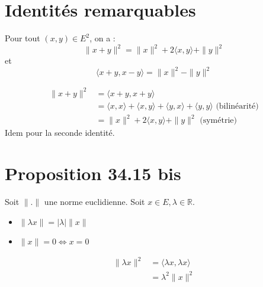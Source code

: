 \documentclass[../main.tex]{subfiles}
\begin{document}
\section{Identités remarquables}
\begin{tcolorbox}[title=Propostion 34.14, title filled=false, colframe=lightblue, colback=lightblue!10!white]
    Pour tout $(x, y) \in E^2$, on a :
    $$\|x+y\|^2=\|x\|^2+2\langle x, y\rangle+\|y\|^2$$
    et
    $$\langle x+y, x-y\rangle=\|x\|^2-\|y\|^2$$
\end{tcolorbox}

\begin{align*}
    \|x+y\|^2 &= \langle x+y, x+y\rangle \\
    &= \langle x, x\rangle + \langle x, y\rangle + \langle y, x\rangle + \langle y, y\rangle \text{ (bilinéarité)} \\
    &= \|x\|^2 + 2\langle x, y\rangle + \|y\|^2 \text{ (symétrie)}
\end{align*}
Idem pour la seconde identité. 

\section{Proposition 34.15 bis}
\begin{tcolorbox}[title=Propostion 34.15 bis, title filled=false, colframe=lightblue, colback=lightblue!10!white]
    Soit $\|.\|$ une norme euclidienne. Soit $x\in E, \lambda\in \mathbb{R}$. 
    \begin{itemize}
        \item $\|\lambda x\| = |\lambda|\|x\|$
        \item $\|x\| = 0 \Leftrightarrow x = 0$
    \end{itemize}
\end{tcolorbox}

\begin{align*}
    \|\lambda x\|^2 &= \langle \lambda x, \lambda x\rangle \\
    &= \lambda^2 \|x\|^2
\end{align*}
\end{document}
